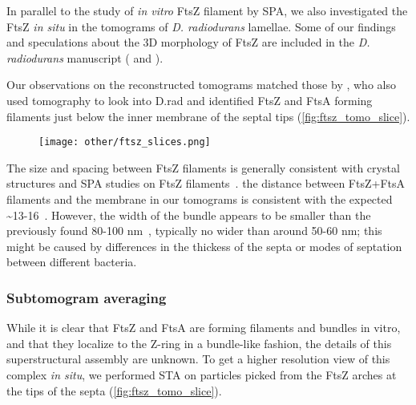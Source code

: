In parallel to the study of \textit{in vitro} FtsZ filament by SPA, we also investigated the FtsZ \textit{in situ} in the tomograms of \textit{D. radiodurans} lamellae.
Some of our findings and speculations about the 3D morphology of FtsZ are included in the \textit{D. radiodurans} manuscript ( and ).

Our observations on the reconstructed tomograms matched those by \citet{sextonSuperresolutionConfocalCryoCLEM2022}, who also used tomography to look into D.rad and identified FtsZ and FtsA forming filaments just below the inner membrane of the septal tips (\autoref{fig:ftsz_tomo_slice}). %

\begin{figure}[ht]
    \centering
    \texttt{[image: other/ftsz\_slices.png]}
    \label{fig:ftsz_tomo_slice}
\end{figure}

The size and spacing between FtsZ filaments is generally consistent with crystal structures and SPA studies on FtsZ filaments~\cite{mcquillenInsightsStructureFunction2020}.
the distance between FtsZ+FtsA filaments and the membrane in our tomograms is consistent with the expected \sim13-16~\cite{mcquillenInsightsStructureFunction2020}.
However, the width of the bundle appears to be smaller than the previously found 80-100 nm~\cite{mcquillenInsightsStructureFunction2020}, typically no wider than around 50-60 nm; this might be caused by differences in the thickess of the septa or modes of septation between different bacteria.

\subsubsection{Subtomogram averaging}

While it is clear that FtsZ and FtsA are forming filaments and bundles in vitro, and that they localize to the Z-ring in a bundle-like fashion, the details of this superstructural assembly are unknown.
To get a higher resolution view of this complex \textit{in situ}, we performed STA on particles picked from the FtsZ arches at the tips of the septa (\autoref{fig:ftsz_tomo_slice}).

